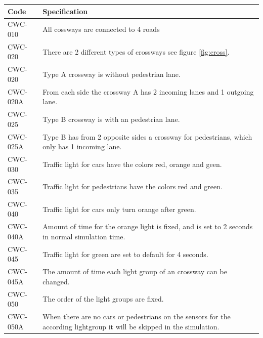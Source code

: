 \begin{tabularx}{\textwidth}{|p{2cm}X|}\hline
	Code & Specification \\\hline
	CWC-010 & All cossways are connected to 4 roads\\\hline
	CWC-020 & There are 2 different types of crossways see figure \ref{fig:cross}.\\\hline
	CWC-020 & Type A crossway is without pedestrian lane.\\\hline
	CWC-020A & From each side the crossway A has 2 incoming lanes and 1 outgoing lane.\\\hline
	CWC-025 & Type B crossway is with an pedestrian lane.\\\hline
	CWC-025A & Type B has from 2 opposite sides a crossway for pedestrians, which only has 1 incoming lane.\\\hline
	CWC-030 & Traffic light for cars have the colors red, orange and geen.\\\hline
	CWC-035 & Traffic light for pedestrians have the colors red and green.\\\hline
	CWC-040 & Traffic light for cars only turn orange after green.\\\hline
	CWC-040A & Amount of time for the orange light is fixed, and is set to 2 seconds in normal simulation time.\\\hline
	CWC-045 & Traffic light for green are set to default for 4 seconds.\\\hline
	CWC-045A & The amount of time each light group of an crossway can be changed.\\\hline
	CWC-050 & The order of the light groups are fixed.\\\hline
	CWC-050A & When there are no cars or pedestrians on the sensors for the according lightgroup it will be skipped in the simulation.\\\hline
\end{tabularx}

